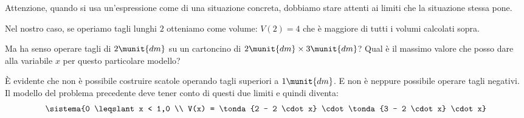 
\begin{osservazione}{}{}
Attenzione, quando si usa un'espressione come  di una 
situazione concreta, dobbiamo stare attenti ai limiti che la situazione 
stessa pone.
\end{osservazione}

Nel nostro caso, se operiamo tagli lunghi \(2\) otteniamo come volume: 
\(V(2) = 4\) che è maggiore di tutti i volumi calcolati sopra.

Ma ha senso operare tagli di \(2\munit{dm}\) su un cartoncino di 
\(2\munit{dm} \times 3\munit{dm}\)?
Qual è il massimo valore che posso dare alla variabile \(x\) per questo 
particolare modello?

È evidente che non è possibile costruire scatole operando tagli 
superiori a \(1\munit{dm}\). E non è neppure possibile operare tagli 
negativi. 
Il modello del problema precedente deve tener conto di questi due limiti 
e quindi diventa:
\[\sistema{0 \leqslant x < 1,0 \\ 
    V(x) = \tonda{2 - 2 \cdot x} \cdot \tonda{3 - 2 \cdot x} \cdot x}
\]

